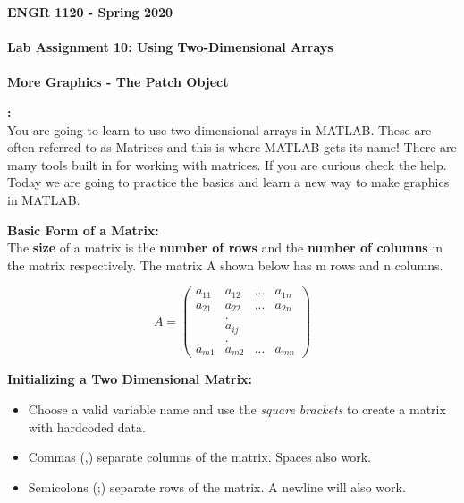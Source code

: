 \documentclass[11pt]{article}
\newcommand{\NUM}{10}
\begin{document}
	\textbf{\LARGE ENGR 1120 - Spring 2020} \\\\
	\textbf{\LARGE Lab Assignment \NUM:  Using Two-Dimensional Arrays}\\\\
	\textbf{\LARGE More Graphics - The Patch Object} \\
	
	\begin{description}
        \vspace{5mm}
		\item [\textbf{ \Large Overview}] \textbf{ \Large :}\\
		
		You are going to learn to use two dimensional arrays in MATLAB. These are often referred to as Matrices and this is where MATLAB gets its name! There are many tools built in for working with matrices. If you are curious check the help. Today we are going to practice the basics and learn a new way to make graphics in MATLAB.

	    \item [\textbf{ \Large }] \textbf{ \Large Basic Form of a Matrix:}\\
	    
	    The {\bf size} of a matrix is the {\bf number of rows} and the  {\bf number of columns} in the matrix respectively. The matrix A shown below has m rows and n columns.
	    
\Large{
\[ A =\left( \begin{array}{cccc}
a_{11} & a_{12} & ...& a_{1n} \\
a_{21} & a_{22} & ...& a_{2n} \\
&.&&\\
&a_{ij}&&\\
&.&&\\
a_{m1} & a_{m2} & ...& a_{mn}\end{array} \right) \] }
		 
        \item [\textbf{ \Large }] \textbf{ \Large Initializing a Two Dimensional Matrix:}
		\begin{itemize}
	\item Choose a valid variable name and use the {\it square brackets} to create a matrix with hardcoded data.

	\item Commas (,) separate columns of the matrix. Spaces also work.

	\item Semicolons (;) separate rows of the matrix. A newline will also work.


\end{itemize}
\end{description}
\end{document}

